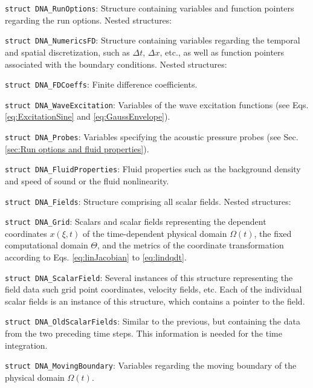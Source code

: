 \begin{compactitem}
\item {\tt struct DNA\_RunOptions}: Structure containing variables and function pointers regarding the run options. Nested structures:
\begin{compactitem}
\item {\tt struct DNA\_NumericsFD}: Structure containing variables regarding the temporal and spatial discretization, such as $\Delta t$, $\Delta x$, etc., as well as function pointers associated with the boundary conditions. Nested structures:
\begin{compactitem}
\item {\tt struct DNA\_FDCoeffs}: Finite difference coefficients.
\end{compactitem}
\item {\tt struct DNA\_WaveExcitation}: Variables of the wave excitation functions (see Eqs. \eqref{eq:ExcitationSine} and \eqref{eq:GaussEnvelope}).
\item {\tt struct DNA\_Probes}: Variables specifying the acoustic pressure probes (see Sec. \ref{sec:Run options and fluid properties}).
\end{compactitem}
\item {\tt struct DNA\_FluidProperties}: Fluid properties such as the background density and speed of sound or the fluid nonlinearity.
\item {\tt struct DNA\_Fields}: Structure comprising all scalar fields. Nested structures:
\begin{compactitem}
\item {\tt struct DNA\_Grid}: Scalars and scalar fields representing the dependent coordinates $x\left(\xi,t\right)$ of the time-dependent physical domain $\Omega\left(t\right)$, the fixed computational domain $\Theta$, and the metrics of the coordinate transformation according to Eqs. \eqref{eq:linJacobian} to \eqref{eq:lindqdt}.
\item {\tt struct DNA\_ScalarField}: Several instances of this structure representing the field data such grid point coordinates, velocity fields, etc. Each of the individual scalar fields is an instance of this structure, which contains a pointer to the field.
\item {\tt struct DNA\_OldScalarFields}: Similar to the previous, but containing the data from the two preceding time steps. This information is needed for the time integration.
\end{compactitem}
\item {\tt struct DNA\_MovingBoundary}: Variables regarding the moving boundary of the physical domain $\Omega\left(t\right)$.
\end{compactitem}



